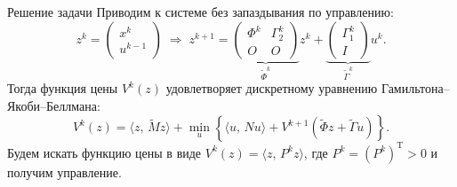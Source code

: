         \begin{frame}{Решение задачи}
                Приводим к системе без запаздывания по управлению:
                \begin{equation*}
                        z^k
                        =
                        \begin{pmatrix}
                                x^k \\ u^{k-1}
                        \end{pmatrix}
                        \;\Longrightarrow\;
                        z^{k+1}
                        =
                        \underbrace{
                                \begin{pmatrix}
                                        \Phi^k & \Gamma_2^k\\
                                        O & O
                                \end{pmatrix}
                        }_{\tilde \Phi^k}
                        z^k + \underbrace{
                                \begin{pmatrix}
                                        \Gamma_1^k \\ I
                                \end{pmatrix}
                        }_{\tilde\Gamma^k} u^k.
                \end{equation*}
                Тогда функция цены $V^k(z)$ удовлетворяет дискретному уравнению Гамильтона--Якоби--Беллмана:
                \begin{equation*}
                        V^k(z) = \langle z,\,\tilde M z\rangle
                        +
                        \min\limits_{u}
                        \left\{
                        \langle
                        u,\,N u
                        \rangle
                        +
                        V^{k+1}(\tilde\Phi z + \tilde\Gamma u)
                        \right\}.
                \end{equation*}
                Будем искать функцию цены в виде $V^k(z) = \langle z,\,P^k z \rangle$, где $P^k = (P^k)^{\mathrm{T}} > 0$ и получим управление.
        \end{frame}
